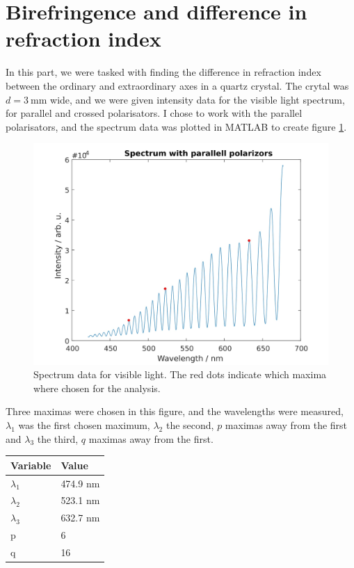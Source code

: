\documentclass[a4paper]{article}
\begin{document}
\section{Birefringence and difference in refraction index}
In this part, we were tasked with finding the difference in refraction index between the ordinary and extraordinary axes in a quartz crystal. The crytal was $d=\SI{3}{\milli\meter}$
wide, and we were given intensity data for the visible light spectrum, for parallel and crossed polarisators. I chose to work with the parallel polarisators, and the spectrum data was
plotted in MATLAB to create figure \ref{fig:spectrum}.
\begin{figure}[h!]
    \centering
    \includegraphics[width=\textwidth]{inked.jpg}
    \caption{Spectrum data for visible light. The red dots indicate which maxima where chosen for the analysis.}
    \label{fig:spectrum}
\end{figure}
Three maximas were chosen in this figure, and the wavelengths were measured, $\lambda_1$ was the first chosen maximum, $\lambda_2$ the second, $p$ maximas away from the first and
$\lambda_3$ the third, $q$ maximas away from the first.
\begin{table}[h!]
    \centering
    \begin{tabular}{|l|l|}
    \hline
    Variable                  & Value    \\ \hline
    $\lambda_1$ & 474.9 nm \\ \hline
    $\lambda_2$ & 523.1 nm \\ \hline
    $\lambda_3$ & 632.7 nm \\ \hline
    p                         & 6        \\ \hline
    q                         & 16       \\ \hline
    \end{tabular}
\end{table}
\end{document}
